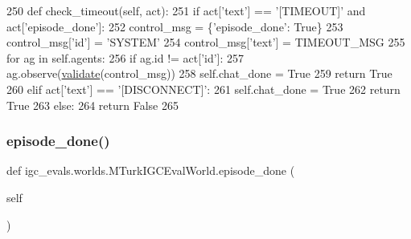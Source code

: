 \begin{DoxyCode}
250     \textcolor{keyword}{def }check\_timeout(self, act):
251         \textcolor{keywordflow}{if} act[\textcolor{stringliteral}{'text'}] == \textcolor{stringliteral}{'[TIMEOUT]'} \textcolor{keywordflow}{and} act[\textcolor{stringliteral}{'episode\_done'}]:
252             control\_msg = \{\textcolor{stringliteral}{'episode\_done'}: \textcolor{keyword}{True}\}
253             control\_msg[\textcolor{stringliteral}{'id'}] = \textcolor{stringliteral}{'SYSTEM'}
254             control\_msg[\textcolor{stringliteral}{'text'}] = TIMEOUT\_MSG
255             \textcolor{keywordflow}{for} ag \textcolor{keywordflow}{in} self.agents:
256                 \textcolor{keywordflow}{if} ag.id != act[\textcolor{stringliteral}{'id'}]:
257                     ag.observe(\hyperlink{namespaceparlai_1_1core_1_1worlds_afc3fad603b7bce41dbdc9cdc04a9c794}{validate}(control\_msg))
258             self.chat\_done = \textcolor{keyword}{True}
259             \textcolor{keywordflow}{return} \textcolor{keyword}{True}
260         \textcolor{keywordflow}{elif} act[\textcolor{stringliteral}{'text'}] == \textcolor{stringliteral}{'[DISCONNECT]'}:
261             self.chat\_done = \textcolor{keyword}{True}
262             \textcolor{keywordflow}{return} \textcolor{keyword}{True}
263         \textcolor{keywordflow}{else}:
264             \textcolor{keywordflow}{return} \textcolor{keyword}{False}
265 
\end{DoxyCode}
\mbox{\label{classigc__evals_1_1worlds_1_1MTurkIGCEvalWorld_a8c3a8c5efdefb5a5475f3290358c2e86}} 
\subsubsection{\texorpdfstring{episode\+\_\+done()}{episode\_done()}}
{\footnotesize\ttfamily def igc\+\_\+evals.\+worlds.\+M\+Turk\+I\+G\+C\+Eval\+World.\+episode\+\_\+done (\begin{DoxyParamCaption}\item[{}]{self }\end{DoxyParamCaption})}



